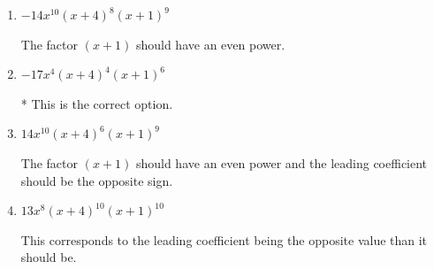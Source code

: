 \documentclass{extbook}[14pt]
\begin{document}
\begin{enumerate}
{\begin{enumerate}[label=\Alph*.]
The factors $x$ and $(x + 1)$ should both have even powers.
\item \( -14x^{10} (x + 4)^{8} (x + 1)^{9} \)

The factor $(x + 1)$ should have an even power.
\item \( -17x^{4} (x + 4)^{4} (x + 1)^{6} \)

* This is the correct option.
\item \( 14x^{10} (x + 4)^{6} (x + 1)^{9} \)

The factor $(x + 1)$ should have an even power and the leading coefficient should be the opposite sign.
\item \( 13x^{8} (x + 4)^{10} (x + 1)^{10} \)

This corresponds to the leading coefficient being the opposite value than it should be.
\end{enumerate}

}
\end{enumerate}
\end{document}
